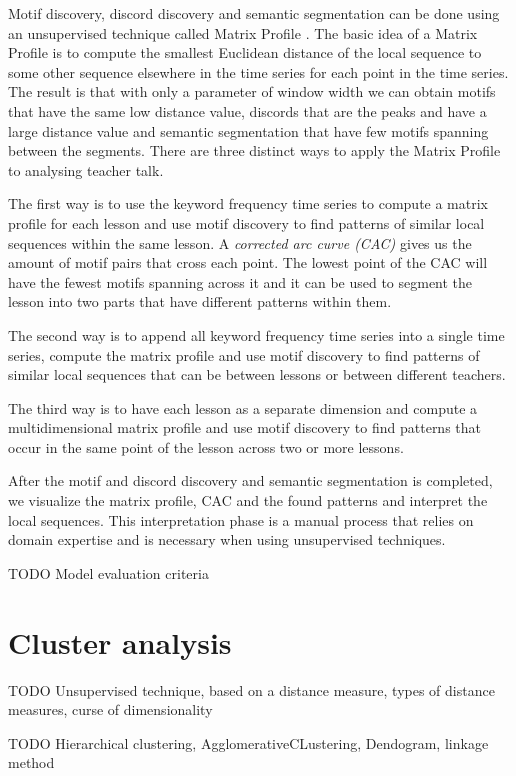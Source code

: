 \documentclass[utf8,english]{gradu3}
\begin{document}
Motif discovery, discord discovery and semantic segmentation can be done using an unsupervised technique called Matrix Profile \parencite{yehUniversalTimeSeries2018}. The basic idea of a Matrix Profile is to compute the smallest Euclidean distance of the local sequence to some other sequence elsewhere in the time series for each point in the time series. The result is that with only a parameter of window width we can obtain motifs that have the same low distance value, discords that are the peaks and have a large distance value and semantic segmentation that have few motifs spanning between the segments. There are three distinct ways to apply the Matrix Profile to analysing teacher talk.

The first way is to use the keyword frequency time series to compute a matrix profile for each lesson and use motif discovery to find patterns of similar local sequences within the same lesson. A \emph{corrected arc curve (CAC)} gives us the amount of motif pairs that cross each point. The lowest point of the CAC will have the fewest motifs spanning across it and it can be used to segment the lesson into two parts that have different patterns within them.

The second way is to append all keyword frequency time series into a single time series, compute the matrix profile and use motif discovery to find patterns of similar local sequences that can be between lessons or between different teachers. 

The third way is to have each lesson as a separate dimension and compute a multidimensional matrix profile and use motif discovery to find patterns that occur in the same point of the lesson across two or more lessons.

After the motif and discord discovery and semantic segmentation is completed, we visualize the matrix profile, CAC and the found patterns and interpret the local sequences. This interpretation phase is a manual process that relies on domain expertise and is necessary when using unsupervised techniques.

TODO Model evaluation criteria

\section{Cluster analysis}

TODO Unsupervised technique, based on a distance measure, types of distance measures, curse of dimensionality

TODO Hierarchical clustering, AgglomerativeCLustering, Dendogram, linkage method
\end{document}
